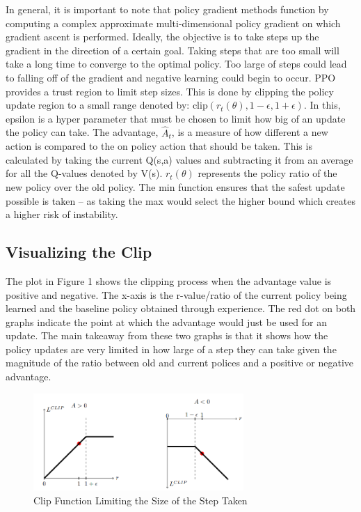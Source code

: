 \documentclass[10pt,twocolumn]{article}
\begin{document}
In general, it is important to note that policy gradient methods function by computing a complex
approximate multi-dimensional policy gradient on which gradient ascent is performed. Ideally,
the objective is to take steps up the gradient in the direction of a certain goal. Taking steps that
are too small will take a long time to converge to the optimal policy. Too large of steps could
lead to falling off of the gradient and negative learning could begin to occur. PPO provides a trust region to limit step sizes. This is done by clipping the policy update region to a small range
denoted by: $\textrm{clip}\left ( r_{t}(\theta), 1-\epsilon, 1 + \epsilon \right )$. In this, epsilon is a 
hyper parameter that must be chosen to limit how big of an update the policy can take. The advantage, $\hat{A}_{t}$, is a measure of how
different a new action is compared to the on policy action that should be taken. This is calculated
by taking the current Q(s,a) values and subtracting it from an average for all the Q-values
denoted by V(s). $r_{t}(\theta)$ represents the policy ratio of the new policy over the old policy. The
min function ensures that the safest update possible is taken – as taking the max would select the
higher bound which creates a higher risk of instability.

\subsection{Visualizing the Clip}

The plot in Figure 1 shows the clipping process when the advantage value is positive and negative.
The x-axis is the r-value/ratio of the current policy being learned and the baseline policy obtained
through experience. The red dot on both graphs indicate the point at which the advantage would
just be used for an update. The main takeaway from these two graphs is that it shows how the policy updates are very limited in how large of a step they can take given the magnitude of the
ratio between old and current polices and a positive or negative advantage.


\begin{figure}
    \centering
    \includegraphics[width=80mm,scale=1]{PPO Clip.png}
    
    \caption{Clip Function Limiting the Size of the Step Taken \cite{DBLP:journals/corr/SchulmanWDRK17}}
    \label{fig:my_label}
\end{figure}
\end{document}
